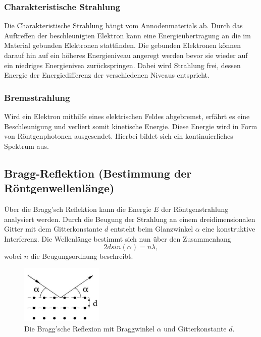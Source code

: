 \subsubsection*{Charakteristische Strahlung}
Die Charakteristische Strahlung hängt vom Annodenmaterials ab. Durch das Auftreffen
der beschleunigten Elektron kann eine Energieübertragung an die im Material gebunden Elektronen stattfinden.
Die gebunden Elektronen können darauf hin auf ein höheres Energieniveau angeregt werden bevor 
sie wieder auf ein niedriges Energienivea zurückspringen. Dabei wird Strahlung frei,
dessen Energie der Energiedifferenz der verschiedenen Niveaus entspricht.

\subsubsection*{Bremsstrahlung}
Wird ein Elektron mithilfe eines elektrischen Feldes abgebremst, erfährt es eine
Beschleunigung und verliert somit kinetische Energie. Diese Energie wird in Form von
Röntgenphotonen ausgesendet. Hierbei bildet sich ein kontinuierliches Spektrum aus.


\subsection{Bragg-Reflektion (Bestimmung der Röntgenwellenlänge)}
Über die Bragg'sch Reflektion kann die Energie $E$ der Röntgenstrahlung analysiert werden.
Durch die Beugung der Strahlung an einem dreidimensionalen Gitter mit dem Gitterkonstante $d$ 
entsteht beim Glanzwinkel $\alpha$ eine konstruktive Interferenz. Die Wellenlänge bestimmt 
sich nun über den Zusammenhang
\begin{equation}
    2 d sin(\alpha)=n \lambda,
    \label{eqn:bragg}
\end{equation}
wobei $n$ die Beugungsordnung beschreibt.
\label{sub:bragg}

\begin{figure}
    \centering
    \includegraphics[width=0.35\textwidth]{plots/bragg.jpg}
    \caption{Die Bragg'sche Reflexion mit Braggwinkel $\alpha$ und 
    Gitterkonstante $d$.\cite[2]{anleitung}
    }
\end{figure}


